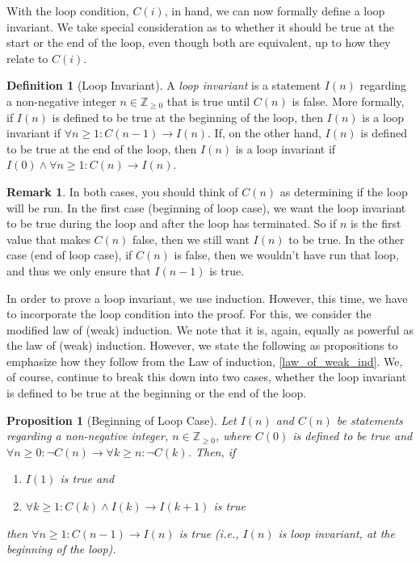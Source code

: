 \documentclass{article}
\newcommand{\ra}{\rightarrow}
\newcommand{\ZZ}{\mathbb{Z}_{\geq 0}}
\theoremstyle{plain}
\newtheorem{proposition}{Proposition}
\theoremstyle{definition}
\newtheorem{definition}{Definition}
\newtheorem{remark}{Remark}
\begin{document}
With the loop condition, \(C(i)\), in hand, we can now formally define a loop invariant. We take special consideration as to whether it should be true at the start or the end of the loop, even though both are equivalent, up to how they relate to \(C(i)\).

\begin{definition}[Loop Invariant]
    A \emph{loop invariant} is a statement \(I(n)\) regarding a non-negative integer \(n \in \ZZ\) that is true until \(C(n)\) is false. More formally, if \(I(n)\) is defined to be true at the beginning of the loop, then \(I(n)\) is a loop invariant if \(\forall n \geq 1 : C(n-1) \ra I(n)\). If, on the other hand, \(I(n)\) is defined to be true at the end of the loop, then \(I(n)\) is a loop invariant if \(I(0) \land \forall n \geq 1 : C(n) \ra I(n)\).
\end{definition}

\begin{remark}
    In both cases, you should think of \(C(n)\) as determining if the loop will be run. In the first case (beginning of loop case), we want the loop invariant to be true during the loop and after the loop has terminated. So if \(n\) is the first value that makes \(C(n)\) false, then we still want \(I(n)\) to be true. In the other case (end of loop case), if \(C(n)\) is false, then we wouldn't have run that loop, and thus we only ensure that \(I(n-1)\) is true. 
\end{remark}

In order to prove a loop invariant, we use induction. However, this time, we have to incorporate the loop condition into the proof. For this, we consider the modified law of (weak) induction. We note that it is, again, equally as powerful as the law of (weak) induction. However, we state the following as propositions to emphasize how they follow from the Law of induction, \cref{law_of_weak_ind}. We, of course, continue to break this down into two cases, whether the loop invariant is defined to be true at the beginning or the end of the loop.

\begin{proposition}[Beginning of Loop Case]\label{law_loop_inv_b}
    Let \(I(n)\) and \(C(n)\) be statements regarding a non-negative integer, \(n \in \ZZ\), where \(C(0)\) is defined to be true and \(\forall n \geq 0: \lnot C(n) \ra \forall k \geq n : \lnot C(k)\). Then, if
    \begin{enumerate}
        \item \(I(1)\) is true and
        \item \(\forall k \geq 1 : C(k) \land I(k) \ra I(k+1)\) is true
    \end{enumerate}    
    then \(\forall n \geq 1 : C(n-1) \ra I(n)\) is true (i.e., \(I(n)\) is loop invariant, at the beginning of the loop).
\end{proposition}
\end{document}
